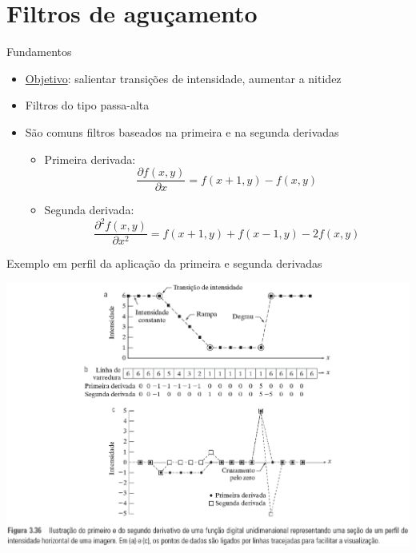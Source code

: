    \section[ slide = true]{Filtros de aguçamento}
      \begin{slide}[toc=]{Fundamentos}
         \begin{itemize}[type=1]
            \item \underline{Objetivo}: salientar transições de intensidade, aumentar a nitidez
            \item Filtros do tipo passa-alta
            \item São comuns filtros baseados na primeira e na segunda derivadas
            \begin{itemize}
               \item Primeira derivada:
               \begin{equation*}
                  \frac{\partial f(x,y)}{\partial x} = f(x+1,y)-f(x,y)
               \end{equation*}
               
               \item Segunda derivada:
               \begin{equation*}
                  \frac{\partial^2 f(x,y)}{\partial x^2} = f(x+1,y)+f(x-1,y)-2f(x,y)
               \end{equation*}
            \end{itemize}
         \end{itemize}
      \end{slide}
      
      \begin{slide}[toc=]{Exemplo em perfil da aplicação da primeira e segunda derivadas}
      \begin{center}
          \includegraphics[width=.85\textwidth]{figs/fig0336}
      \end{center} 
      \end{slide}
      
